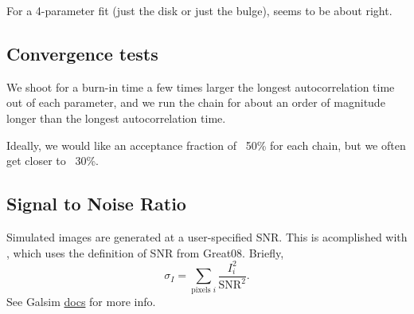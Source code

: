 \documentclass{article}
\begin{document}
For a 4-parameter fit (just the disk or just the bulge),  seems to be about right.

\subsection{Convergence tests}
We shoot for a burn-in time a few times larger the longest
autocorrelation time out of each parameter, and we run the chain for
about an order of magnitude longer than the longest autocorrelation
time.

Ideally, we would like an acceptance fraction of ~50\% for each chain, but
we often get closer to ~30\%.

\subsection{Signal to Noise Ratio}
Simulated images are generated at a user-specified SNR.  This is
acomplished with , which uses the
definition of SNR from Great08.  Briefly,
\[
\sigma_I = \sum_{\textrm{pixels } i}\frac{I_i^2}{\textrm{SNR}^2}.
\]
See Galsim
\href{http://galsim-developers.github.io/GalSim/namespacegalsim\
_1_1noise.html#a86f91278331ac9c134c25b16d4c67a32}{docs}
for more info.
\end{document}
